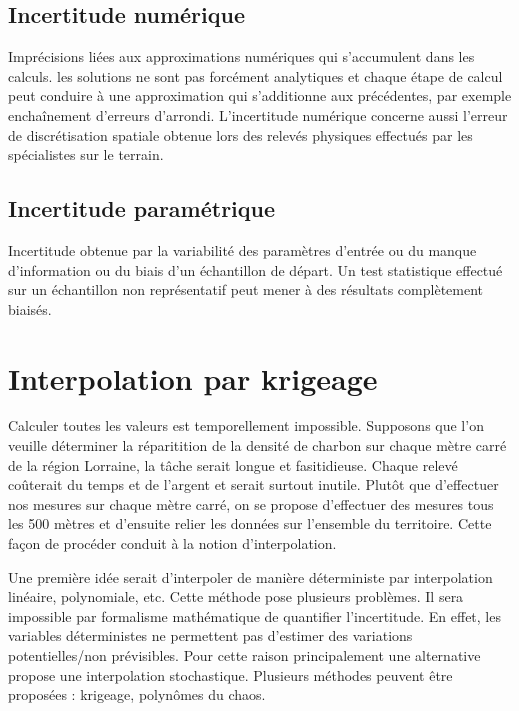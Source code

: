 \documentclass[hidelinks,12pt]{article}
\begin{document}
\subsection{Incertitude numérique}


Imprécisions liées aux approximations numériques qui s’accumulent dans les calculs. les solutions ne sont pas forcément analytiques et chaque étape de calcul peut conduire à une approximation qui s’additionne aux précédentes, par exemple enchaînement d’erreurs d’arrondi. L’incertitude numérique concerne aussi l’erreur de discrétisation spatiale obtenue lors des relevés physiques effectués par les spécialistes sur le terrain.

\subsection{Incertitude paramétrique}

Incertitude obtenue par la variabilité des paramètres d’entrée ou du manque d’information ou du biais d’un échantillon de départ. Un test statistique effectué sur un échantillon non représentatif peut mener à des résultats complètement biaisés.



\section{Interpolation par krigeage}

Calculer toutes les valeurs est temporellement impossible. Supposons que l'on veuille déterminer la réparitition de la densité de charbon sur chaque mètre carré de la région Lorraine, la tâche serait longue et fasitidieuse. Chaque relevé coûterait du temps et de l'argent et serait surtout inutile. Plutôt que d'effectuer nos mesures sur chaque mètre carré, on se propose d'effectuer des mesures tous les 500 mètres et d'ensuite relier les données sur l'ensemble du territoire. Cette façon de procéder conduit à la notion d'interpolation.

Une première idée serait d'interpoler de manière déterministe par interpolation linéaire, polynomiale, etc. Cette méthode pose plusieurs problèmes. Il sera impossible par formalisme mathématique de quantifier l'incertitude. En effet, les variables déterministes ne permettent pas d'estimer des variations potentielles/non prévisibles. Pour cette raison principalement une alternative propose une interpolation stochastique. Plusieurs méthodes peuvent être proposées : krigeage, polynômes du chaos.
\end{document}
